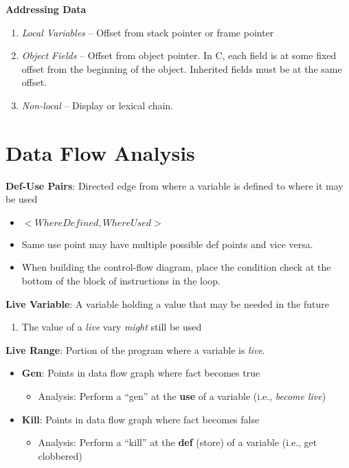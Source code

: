 \documentclass[10pt,twocolumn]{report}
\newcommand{\red}[1]{{\color{red} #1}}
\newcommand{\green}[1]{{\color{green} #1}}
\begin{document}
\textbf{Addressing Data}
\begin{enumerate}
  \item \emph{Local Variables} -- Offset from stack pointer or frame pointer
  \item \emph{Object Fields} -- Offset from object pointer. In C, each field is at some fixed offset from the beginning of the object.  Inherited fields must be at the same offset.
  \item \emph{Non-local} -- Display or lexical chain.
\end{enumerate}

\section{Data Flow Analysis}

\textbf{Def-Use Pairs}: Directed edge from where a variable is defined to where it may be used
\begin{itemize}
  \item $<WhereDefined,WhereUsed>$
  \item Same use point may have multiple possible def points and vice versa.
  \item When building the control-flow diagram, place the condition check at the bottom of the block of instructions in the loop.
\end{itemize}

\textbf{Live Variable}: A variable holding a value that may be needed in the future
\begin{enumerate}
  \item The value of a \emph{live} vary \emph{might} still be used
\end{enumerate}

\textbf{Live Range}: Portion of the program where a variable is \textit{live}.

\begin{itemize}
  \item \textbf{Gen}: Points in data flow graph where fact becomes \green{true}
    \begin{itemize}
      \item Analysis: Perform a ``gen'' at the \textbf{use} of a variable (i.e., \textit{become live})
    \end{itemize}
  \item \textbf{Kill}: Points in data flow graph where fact becomes \red{false}
    \begin{itemize}
      \item Analysis: Perform a ``kill'' at the \textbf{def} (store) of a variable  (i.e., get clobbered)
    \end{itemize}
\end{itemize}
\end{document}
